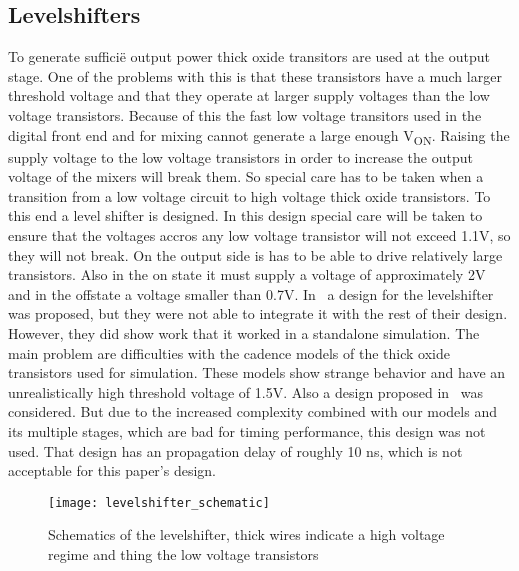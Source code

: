 \makeatletter
\newcommand*{\textoverline}[1]{$\overline{\hbox{#1}}\m@th$}
\makeatother

\subsection{Levelshifters}\label{sec:levelshifter}
To generate suffici\"{e} output power thick oxide transitors are used at the output stage. One of the problems with this is that these transistors have a much larger threshold voltage and that they operate at larger supply voltages than the low voltage transistors. Because of this the fast low voltage transitors used in the digital front end and for mixing cannot generate a large enough V\textsubscript{ON}. Raising the supply voltage to the low voltage transistors in order to increase the output voltage of the mixers will break them. So special care has to be taken when a transition from a low voltage circuit to high voltage thick oxide transistors. To this end a level shifter is designed. In this design special care will be taken to ensure that the voltages accros any low voltage transistor will not exceed 1.1V, so they will not break. On the output side is has to be able to drive relatively large transistors. Also in the on state it must supply a voltage of approximately 2V and in the offstate a voltage smaller than 0.7V. 
In~\cite{powerdac} a design for the levelshifter was proposed, but they were not able to integrate it with the rest of their design. However, they did show work that it worked in a standalone simulation. The main problem are difficulties with the cadence models of the thick oxide transistors used for simulation. These models show strange behavior and have an unrealistically high threshold voltage of 1.5V. Also a design proposed in~\cite{hass2000level} was considered. But due to the increased complexity combined with our models and its multiple stages, which are bad for timing performance, this design was not used. That design has an propagation delay of roughly 10 ns, which is not acceptable for this paper's design. 
\begin{figure}[h]
 \texttt{[image: levelshifter\_schematic]}
 \caption{Schematics of the levelshifter, thick wires indicate a high voltage regime and thing the low voltage transistors}
 \label{fig:schematic_levelshifter}
\end{figure}
